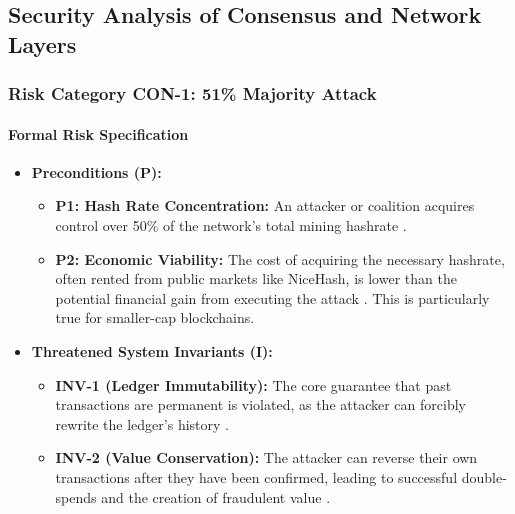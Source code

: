 \subsection{Security Analysis of Consensus and Network Layers}
\label{sec:results_consensus_network}

\subsubsection{Risk Category CON-1: 51\% Majority Attack}

\paragraph{Formal Risk Specification}

\begin{itemize}
    \item \textbf{Preconditions (P):}
    \begin{itemize}
        \item \textbf{P1: Hash Rate Concentration:} An attacker or coalition acquires control over 50\% of the network's total mining hashrate \cite{wang2019, eyal2014}.
        \item \textbf{P2: Economic Viability:} The cost of acquiring the necessary hashrate, often rented from public markets like NiceHash, is lower than the potential financial gain from executing the attack \cite{casino2019}. This is particularly true for smaller-cap blockchains.
    \end{itemize}

    \item \textbf{Threatened System Invariants (I):}
    \begin{itemize}
        \item \textbf{INV-1 (Ledger Immutability):} The core guarantee that past transactions are permanent is violated, as the attacker can forcibly rewrite the ledger's history \cite{wang2019}.
        \item \textbf{INV-2 (Value Conservation):} The attacker can reverse their own transactions after they have been confirmed, leading to successful double-spends and the creation of fraudulent value \cite{eyal2014}.
    \end{itemize}


\end{itemize}
